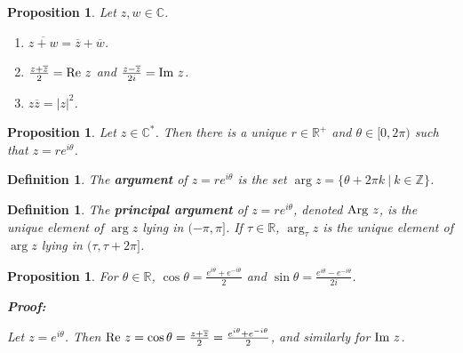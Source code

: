 \documentclass{article}
\theoremstyle{colontheorem}
\newtheorem{proposition}[theorem]{Proposition}
\newtheorem{definition}[theorem]{Definition}
\newcommand{\re}{\textnormal{Re }}
\newcommand{\im}{\textnormal{Im }}
\newcommand{\Arg}{\textnormal{Arg }}
\newenvironment{Proposition}
{
	\begin{mdframed}[backgroundcolor=TheoremOrange!10]
	\begin{proposition}
}
{
	\end{proposition}
	\end{mdframed}
	
	\vspace{.15in}
}
\newenvironment{Def}
{
	\begin{mdframed}[backgroundcolor=DefGreen!10]
	\begin{definition}
}
{
	\end{definition}
	\end{mdframed}
	
	\vspace{.15in}
}
\newenvironment{Proof}
{
	\begin{mdframed}[backgroundcolor=ProofPurple!10]
	\textbf{Proof:}%
}
{
	\end{mdframed}
	
	\vspace{.085in}
}
\begin{document}
\begin{Proposition}
	
	Let $z, w \in \mathbb{C}$.
	
	\begin{enumerate}
		
		\item $\overline{z + w} = \overline{z} + \overline{w}$.
		
		\item $\frac{z + \overline{z}}{2} = \re z$ and $\frac{z - \overline{z}}{2i} = \im z$.
		
		\item $z \overline{z} = |z|^2$.
		
	\end{enumerate}
	
\end{Proposition}



\begin{Proposition}
	
	Let $z \in \mathbb{C}^*$. Then there is a unique $r \in \mathbb{R}^+$ and $\theta \in [0, 2\pi)$ such that $z = re^{i\theta}$.
	
\end{Proposition}



\begin{Def}
	
	The \textbf{argument} of $z = re^{i\theta}$ is the set $\arg z = \{\theta + 2\pi k\ |\ k \in \mathbb{Z}\}$.
	
\end{Def}



\begin{Def}
	
	The \textbf{principal argument} of $z = re^{i\theta}$, denoted $\Arg z$, is the unique element of $\arg z$ lying in $(-\pi, \pi]$. If $\tau \in \mathbb{R}$, $\arg_\tau z$ is the unique element of $\arg z$ lying in $(\tau, \tau+2\pi]$.
	
\end{Def}



\begin{Proposition}
	
	For $\theta \in \mathbb{R}$, $\cos \theta = \frac{e^{i\theta} + e^{-i\theta}}{2}$ and $\sin \theta = \frac{e^{i\theta} - e^{-i\theta}}{2i}$.
	
	\begin{Proof}
		Let $z = e^{i\theta}$. Then $\re z = \cos \theta = \frac{z + \overline{z}}{2} = \frac{e^{i\theta} + e^{-i\theta}}{2}$, and similarly for $\im z$.
		
	\end{Proof}
	
\end{Proposition}
\end{document}
